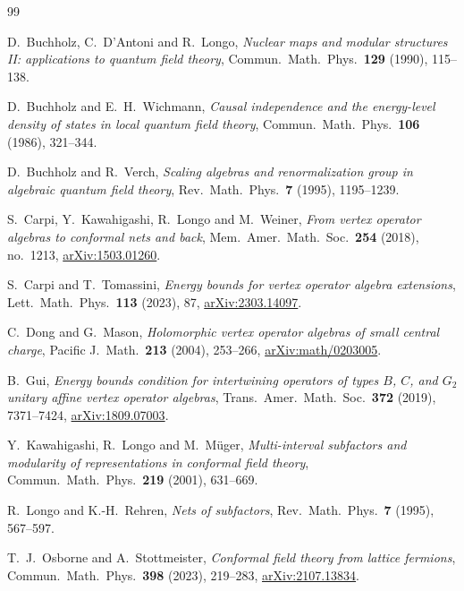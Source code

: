 \documentclass[11pt]{article}
\theoremstyle{remark}
\begin{document}
\begin{thebibliography}{99}

D.~Buchholz, C.~D'Antoni and R.~Longo,
\emph{Nuclear maps and modular structures II: applications to quantum
field theory},
Commun.\ Math.\ Phys.\ \textbf{129} (1990), 115--138.

D.~Buchholz and E.~H.~Wichmann,
\emph{Causal independence and the energy-level density of states in
local quantum field theory},
Commun.\ Math.\ Phys.\ \textbf{106} (1986), 321--344.

D.~Buchholz and R.~Verch,
\emph{Scaling algebras and renormalization group in algebraic quantum
field theory},
Rev.\ Math.\ Phys.\ \textbf{7} (1995), 1195--1239.

S.~Carpi, Y.~Kawahigashi, R.~Longo and M.~Weiner,
\emph{From vertex operator algebras to conformal nets and back},
Mem.\ Amer.\ Math.\ Soc.\ \textbf{254} (2018), no.~1213,
\href{https://arxiv.org/abs/1503.01260}{arXiv:1503.01260}.

S.~Carpi and T.~Tomassini,
\emph{Energy bounds for vertex operator algebra extensions},
Lett.\ Math.\ Phys.\ \textbf{113} (2023), 87,
\href{https://arxiv.org/abs/2303.14097}{arXiv:2303.14097}.

C.~Dong and G.~Mason,
\emph{Holomorphic vertex operator algebras of small central charge},
Pacific J.\ Math.\ \textbf{213} (2004), 253--266,
\href{https://arxiv.org/abs/math/0203005}{arXiv:math/0203005}.

B.~Gui,
\emph{Energy bounds condition for intertwining operators of types
$B$, $C$, and $G_2$ unitary affine vertex operator algebras},
Trans.\ Amer.\ Math.\ Soc.\ \textbf{372} (2019), 7371--7424,
\href{https://arxiv.org/abs/1809.07003}{arXiv:1809.07003}.

Y.~Kawahigashi, R.~Longo and M.~M\"uger,
\emph{Multi-interval subfactors and modularity of representations in
conformal field theory},
Commun.\ Math.\ Phys.\ \textbf{219} (2001), 631--669.

R.~Longo and K.-H.~Rehren,
\emph{Nets of subfactors},
Rev.\ Math.\ Phys.\ \textbf{7} (1995), 567--597.

T.~J.~Osborne and A.~Stottmeister,
\emph{Conformal field theory from lattice fermions},
Commun.\ Math.\ Phys.\ \textbf{398} (2023), 219--283,
\href{https://arxiv.org/abs/2107.13834}{arXiv:2107.13834}.


\end{thebibliography}
\end{document}
